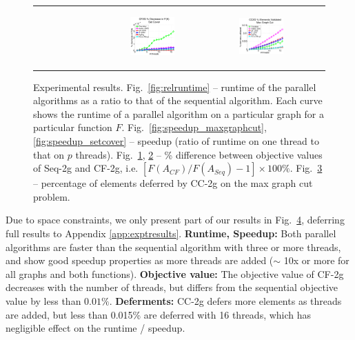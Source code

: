 \documentclass{article} %
\newcommand{\hogwild}{CF-2g}
\newcommand{\occ}{CC-2g}
\newcommand{\seqalg}{Seq-2g}
\newcommand{\hogwildshort}{CF}
\newcommand{\seqalgshort}{Seq}
\newcommand{\figref}[1]{Fig.~\ref{#1}}
\begin{document}
\begin{figure}[ht]
\begin{tabular}{cccc}
\begin{subfigure}[h]{0.30\textwidth}
			\caption{}
			\label{fig:difffa_maxgraphcut}
	  \end{subfigure} &
	  \begin{subfigure}[h]{0.30\textwidth}
	  	\includegraphics[width=130pt]{images/summary_diffFA_setcover.pdf}
			\caption{}
			\label{fig:difffa_setcover}
	  \end{subfigure} &
	  \begin{subfigure}[h]{0.30\textwidth}
	  	\includegraphics[width=130pt]{images/summary_validated_maxgraphcut.pdf}
			\caption{}
			\label{fig:validated_maxgraphcut}
	  \end{subfigure} \\
  \end{tabular}
  \caption{\footnotesize Experimental results.
  \figref{fig:relruntime} -- runtime of the parallel algorithms as a ratio to that of the sequential algorithm. Each curve shows the runtime of a parallel algorithm on a particular graph for a particular function $F$.
  \figref{fig:speedup_maxgraphcut}, \ref{fig:speedup_setcover} -- speedup (ratio of runtime on one thread to that on $p$ threads).
  \figref{fig:difffa_maxgraphcut}, \ref{fig:difffa_setcover} -- \% difference between objective values of \seqalg{} and \hogwild{}, i.e. $[F(A_{\hogwildshort{}}) / F(A_{\seqalgshort{}}) - 1] \times 100\%$.
  \figref{fig:validated_maxgraphcut} -- percentage of elements deferred by \occ{} on the max graph cut problem.
  }
\label{fig:results_quality}
\end{figure}


Due to space constraints, we only present part of our results in \figref{fig:results_quality}, deferring full results to Appendix \ref{app:exptresults}.
\textbf{Runtime, Speedup:} Both parallel algorithms are faster than the sequential algorithm with three or more threads, and show good speedup properties as more threads are added ($\sim$ 10x or more for all graphs and both functions).
\textbf{Objective value:} The objective value of \hogwild{} decreases with the number of threads, but differs from the sequential objective value by less than $0.01\%$.
\textbf{Deferments:} \occ{} defers more elements as threads are added, but less than 0.015\% are deferred with 16 threads, which has negligible effect on the runtime / speedup.
\end{document}
